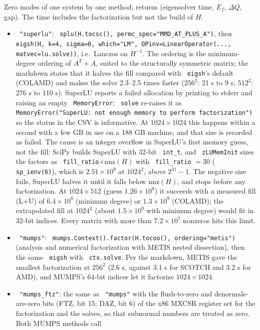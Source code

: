\documentclass[11pt]{article}
\renewenvironment{function}[1]{\par\Needspace{7\baselineskip}\medskip\noindent{\raggedright\textbf{\large\texttt{\hyphenchar\font=-1 #1}}\par}\nopagebreak}{\par\medskip}
\renewcommand{\code}[1]{\texttt{\hyphenchar\font=-1 #1}}
\begin{document}
\begin{function}{solve(Lx, Ly, method, ell=12)}
Zero modes of one system by one method; returns (eigensolver time, $E_f$, $\Delta Q$, gap). The time includes the factorization but not the
build of $H$.
\begin{itemize}
\item \code{"superlu"}: \code{splu(H.tocsc(), permc\_spec="MMD\_AT\_PLUS\_A")}, then
  \code{eigsh(H, k=4, sigma=0, which="LM", OPinv=LinearOperator(..., matvec=lu.solve))}, i.e.\ Lanczos on $H^{-1}$. The ordering is the
  minimum-degree ordering of $A^T+A$, suited to the structurally symmetric matrix; the markdown states that it halves the fill compared with
  \code{eigsh}'s default (COLAMD) and makes the solve 2.3--2.5 times faster ($256^2$: 21 s to 9 s; $512^2$: 276 s to 110 s). SuperLU reports a failed
  allocation by printing to stderr and raising an empty \code{MemoryError}; \code{solve} re-raises it as
  \code{MemoryError("SuperLU: not enough memory to perform factorization")} so the status in the CSV is informative. At $1024\times1024$
  this happens within a second with a few GB in use on a 188 GB machine, and that size is recorded as failed. The cause is an integer
  overflow in SuperLU's first memory guess, not the fill: SciPy builds SuperLU with 32-bit \code{int\_t}, and \code{zLUMemInit} sizes the factors as
  \code{fill\_ratio}$\times\text{nnz}(H)$ with \code{fill\_ratio} $= 30$ (\code{sp\_ienv(6)}), which is $2.51\times10^9$ at $1024^2$, above $2^{31}-1$. The negative
  size fails, SuperLU halves it until it falls below nnz$(H)$, and stops before any factorization. At $1024\times512$ (guess $1.26\times10^9$) it
  succeeds with a measured fill (L+U) of $6.4\times10^8$ (minimum degree) or $1.3\times10^9$ (COLAMD); the extrapolated fill at $1024^2$ (about $1.5\times10^9$
  with minimum degree) would fit in 32-bit indices. Every matrix with more than $7.2\times10^7$ nonzeros hits this limit.
\item \code{"mumps"}: \code{mumps.Context().factor(H.tocoo(), ordering="metis")} (analysis and numerical factorization with METIS nested
  dissection), then the same \code{eigsh} with \code{ctx.solve}. Per the markdown, METIS gave the smallest factorization at $256^2$ (2.6 s, against
  3.1 s for SCOTCH and 3.2 s for AMD), and MUMPS's 64-bit indices let it factorize $1024\times1024$.
\item \code{"mumps\_ftz"}: the same as \code{"mumps"} with the flush-to-zero and denormals-are-zero bits (FTZ, bit 15; DAZ, bit 6) of the
  x86 MXCSR register set for the factorization and the solves, so that subnormal numbers are treated as zero. Both MUMPS methods call

\end{itemize}
\end{function}
\end{document}
